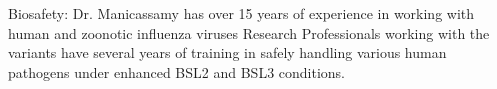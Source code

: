 \documentclass[onecolumn, compsoc,12pt]{IEEEtran}
\begin{document}
Biosafety: Dr. Manicassamy has over 15 years of experience in working with human and
zoonotic influenza viruses Research Professionals working with the variants have several
years of training in safely handling various human pathogens under enhanced BSL2 and BSL3
conditions.




\clearpage
{}


 



\clearpage



\end{document}
